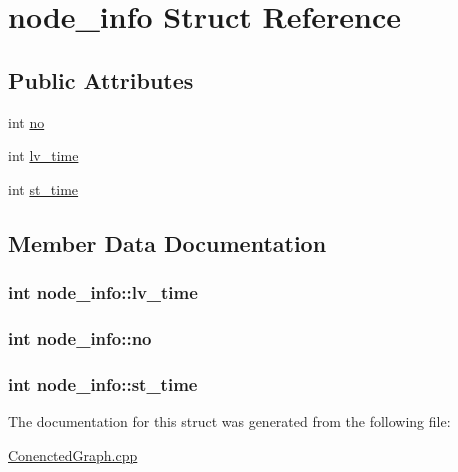 \hypertarget{structnode__info}{}\section{node\+\_\+info Struct Reference}
\label{structnode__info}
\subsection*{Public Attributes}
\begin{DoxyCompactItemize}
\item 
int \hyperlink{structnode__info_a69968058a534ead0624aeaf1428ed902}{no}
\item 
int \hyperlink{structnode__info_a85fd243a529e8b5387e2f744ec6f0ab1}{lv\+\_\+time}
\item 
int \hyperlink{structnode__info_a303996389f9a5755e0ddd41faa3eb987}{st\+\_\+time}
\end{DoxyCompactItemize}


\subsection{Member Data Documentation}
\subsubsection[{\texorpdfstring{lv\+\_\+time}{lv_time}}]{\setlength{\rightskip}{0pt plus 5cm}int node\+\_\+info\+::lv\+\_\+time}\hypertarget{structnode__info_a85fd243a529e8b5387e2f744ec6f0ab1}{}\label{structnode__info_a85fd243a529e8b5387e2f744ec6f0ab1}
\subsubsection[{\texorpdfstring{no}{no}}]{\setlength{\rightskip}{0pt plus 5cm}int node\+\_\+info\+::no}\hypertarget{structnode__info_a69968058a534ead0624aeaf1428ed902}{}\label{structnode__info_a69968058a534ead0624aeaf1428ed902}
\subsubsection[{\texorpdfstring{st\+\_\+time}{st_time}}]{\setlength{\rightskip}{0pt plus 5cm}int node\+\_\+info\+::st\+\_\+time}\hypertarget{structnode__info_a303996389f9a5755e0ddd41faa3eb987}{}\label{structnode__info_a303996389f9a5755e0ddd41faa3eb987}


The documentation for this struct was generated from the following file\+:\begin{DoxyCompactItemize}
\item 
\hyperlink{ConenctedGraph_8cpp}{Conencted\+Graph.\+cpp}\end{DoxyCompactItemize}
